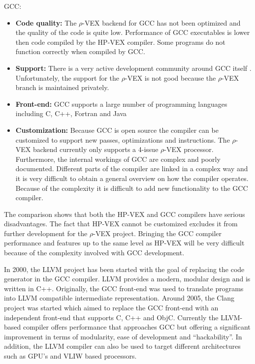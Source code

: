 GCC:
\begin{itemize}
	\item \textbf{Code quality:} The $\rho$-VEX backend for GCC has not been optimized and the quality of the code is quite low. Performance of GCC executables is lower then code compiled by the HP-VEX compiler. Some programs do not function correctly when compiled by GCC.
	\item \textbf{Support:} There is a very active development community around GCC itself \cite{gcc:2014}. Unfortunately, the support for the $\rho$-VEX is not good because the $\rho$-VEX branch is maintained privately.
	\item \textbf{Front-end:} GCC supports a large number of programming languages including C, C++, Fortran and Java
	\item \textbf{Customization:} Because GCC is open source the compiler can be customized to support new passes, optimizations and instructions. The $\rho$-VEX backend currently only supports a 4-issue $\rho$-VEX processor. Furthermore, the internal workings of GCC are complex and poorly documented. Different parts of the compiler are linked in a complex way and it is very difficult to obtain a general overview on how the compiler operates. Because of the complexity it is difficult to add new functionality to the GCC compiler.
\end{itemize}

The comparison shows that both the HP-VEX and GCC compilers have serious disadvantages. The fact that HP-VEX cannot be customized excludes it from further development for the $\rho$-VEX project. Bringing the GCC compiler performance and features up to the same level as HP-VEX will be very difficult because of the complexity involved with GCC development.  

In 2000, the LLVM project \cite{Chris-Lattner:2004lq} has been started with the goal of replacing the code generator in the GCC compiler. LLVM provides a modern, modular design and is written in C++. Originally, the GCC front-end was used to translate programs into LLVM compatible intermediate representation. Around 2005, the Clang project was started which aimed to replace the GCC front-end with an independent front-end that supports C, C++ and ObjC. Currently the LLVM-based compiler offers performance that approaches GCC but offering a significant improvement in terms of modularity, ease of development and ``hackability''. In addition, the LLVM compiler can also be used to target different architectures such as GPU's and VLIW based processors.

